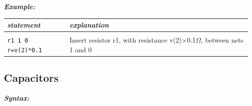 {\textbf{\textit{Example:}}

\begin{longtable}{l l}
\textit{statement} & \textit{explanation} \\ \hline \\ %
		\begin{minipage}{15em}\texttt{r1 1 0 r={v(2)*0.1}}\end{minipage} 
			& \begin{minipage}{15em}{\small Insert resistor r1, with resistance v(2)$\times$0.1$\Omega$, between nets 1 and 0}\end{minipage} 
\end{longtable}
}


\newpage
\subsection{Capacitors}
\label{subsec_sceadm_capacitors}

\textbf{\textit{Syntax:}}


